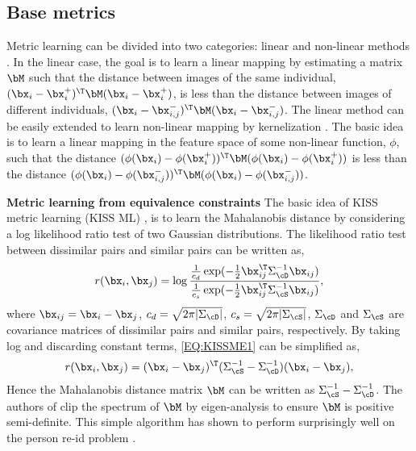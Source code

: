 \documentclass[10pt,twocolumn,letterpaper]{article}
\def\bxi{{\bx_i}}
\def\bxj{{\bx_j}}
\def\bxip{{\bx_i^{+}}}
\def\bxijm{{\bx_{i,j}^{-}}}
\renewcommand{\paragraph}{\textbf}
\begin{document}
\subsection{Base metrics}
\label{sec:metric}
Metric learning can be divided into two categories:
linear \cite{Davis2007Information,Kostinger2012Large,Weinberger2006Distance}
and non-linear methods \cite{Chopra2005Learning,Frome2007Learning,
Kedem2012Nonlinear,Weinberger2008Fast,Xiong2014Person}.
In the linear case, the goal is to learn a linear mapping
by estimating a matrix $\bM$
such that the distance between images of the same individual,
$(\bxi - \bxip)^\T \bM (\bxi - \bxip)$, is less than
the distance between images of different individuals,
$(\bxi - \bxijm)^\T \bM (\bxi - \bxijm)$.
The linear method can be easily extended to learn non-linear
mapping by kernelization \cite{Shawe2004Kernel}.
The basic idea is to learn a linear mapping in the feature space of some
non-linear function, $\phi$,
such that
the distance
$( \phi(\bxi) - \phi(\bxip) )^\T \bM ( \phi(\bxi) - \phi(\bxip) )$
is less than
the distance
$( \phi(\bxi) - \phi(\bxijm) )^\T \bM ( \phi(\bxi) - \phi(\bxijm) )$.


\paragraph{Metric learning from equivalence constraints}
The basic idea of KISS metric learning
(KISS ML) \cite{Kostinger2012Large}, is to
learn the Mahalanobis distance by considering a log likelihood ratio
test of two Gaussian distributions.
The likelihood ratio test between dissimilar pairs and similar pairs
can be written as,
\begin{align}
    \label{EQ:KISSME1}
    r(\bxi,\bxj) = \log \frac{ \frac{1}{c_d} \exp(-\frac{1}{2} \bx_{ij}^\T \Sigma_{\cD}^{-1} \bx_{ij}  )}
                             { \frac{1}{c_s} \exp(-\frac{1}{2} \bx_{ij}^\T \Sigma_{\cS}^{-1} \bx_{ij}  )} ,
\end{align}
where $\bx_{ij} = \bx_{i} - \bx_{j}$,
$c_d = \sqrt{2 \pi | \Sigma_{\cD} |} $,
$c_s = \sqrt{2 \pi | \Sigma_{\cS} |} $,
$\Sigma_{\cD}$ and $\Sigma_{\cS}$ are covariance matrices of
dissimilar pairs and similar pairs, respectively.
By taking log and discarding constant terms,
\eqref{EQ:KISSME1} can be simplified as,
\begin{align}
    \label{EQ:KISSME2}
    r(\bxi,\bxj) = (\bx_{i} - \bx_{j})^\T (\Sigma_{\cS}^{-1} - \Sigma_{\cD}^{-1})
                      (\bx_{i} - \bx_{j}),
\end{align}
Hence the Mahalanobis distance matrix $\bM$ can be written as
$\Sigma_{\cS}^{-1} - \Sigma_{\cD}^{-1}$.
The authors of \cite{Kostinger2012Large} clip the spectrum of $\bM$ by eigen-analysis
to ensure $\bM$ is positive semi-definite.
This simple algorithm has shown to perform surprisingly well on
the person re-id problem
\cite{Roth2014Mahalanobis, Li2014Deep}.
\end{document}
